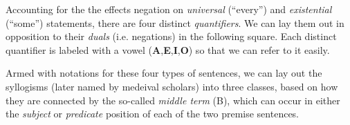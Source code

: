 \begin{definition}
  Accounting for the the effects negation on \emph{universal} (``every'') and
  \emph{existential} (``some'') statements, there are four distinct
  \emph{quantifiers}. We can lay them out in opposition to their \emph{duals}
  (i.e. negations) in the following square. Each distinct quantifier is labeled
  with a vowel (\textbf{A},\textbf{E},\textbf{I},\textbf{O}) so that we can
  refer to it easily.
  \begin{center}
  \end{center}


  
\end{definition}

Armed with notations for these four types of sentences, we can lay out the
syllogisms (later named by medeival scholars) into three classes, based on
how they are connected by the so-called \emph{middle term} (B), which can
occur in either the \emph{subject} or \emph{predicate} position of each of the
two premise sentences.

